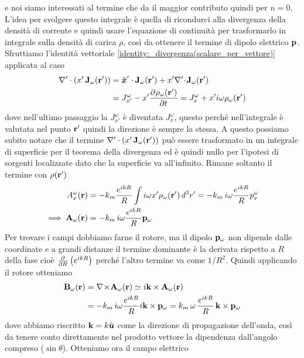 e noi siamo interessati al termine che da il maggior contributo quindi per $ n = 0 $. L'idea per svolgere questo integrale è quella di ricondurci alla 
divergenza della densità di corrente e quindi usare l'equazione di continuità per trasformarlo in integrale sulla densità di carica $ \rho $, così da 
ottenere il termine di dipolo elettrico $ \mathbf{p} $. Sfruttiamo l'identità vettoriale \eqref{identity:_divergenza(scalare_per_vettore)} applicata al caso
\begin{align}
  \nabla' \cdot \left( x' \, \mathbf{J}_\omega(\mathbf{r'}) \right) &= \hat{\boldsymbol{x}}' \cdot \mathbf{J}_\omega(\mathbf{r'}) + x' \nabla'\!\cdot\!\mathbf{ J }_\omega(\mathbf{r'}) 
  \\
  &= J_{x'}^\omega - x' \frac{\partial^{} {\rho_\omega(\mathbf{r'})}}{\partial {t}^{}} = J_{x}^\omega + x' i\omega \rho_\omega(\mathbf{r'})
\end{align}
dove nell'ultimo passaggio la $ J_{x'}^\omega $ è diventata $ J_{x}^\omega $, questo perché nell'integrale è valutata nel punto $ \mathbf{r'} $ quindi la 
direzione è sempre la stessa. A questo possiamo subito notare che il termine $ \nabla' \cdot \left( x' \, \mathbf{J}_\omega(\mathbf{r'}) \right) $ può essere 
trasformato in un integrale di superficie per il teorema della divergenza ed è quindi nullo per l'ipotesi di sorgenti localizzate dato che la superficie 
va all'infinito. Rimane soltanto il termine con $ \rho(\mathbf{r'}) $
\begin{align}
  A_{x}^\omega(\mathbf{r}) &= -k_m \frac{e^{ikR}}{R} \int i\omega x'\rho_\omega(\mathbf{r'}) \,d^3r' 
  = -k_m \, i \omega \frac{e^{ikR}}{R} p_{x}^\omega
  \\
  \implies \mathbf{A}_{\omega}(\mathbf{r}) &= -k_m \,i \omega \frac{e^{ikR}}{R} \mathbf{p}_{\omega}
\end{align}
Per trovare i campi dobbiamo farne il rotore, ma il dipolo $ \mathbf{p}_\omega $ non dipende dalle coordinate e a grandi distanze il termine dominante è la 
derivata rispetto a $ R $ della fase cioè $ \frac{\partial^{} {}}{\partial {R}^{}} \left( e^{ikR} \right) $ perché l'altro termine va come $ 1/R^2 $. Quindi applicando il rotore 
otteniamo
\begin{align}
  \mathbf{B}_\omega(\mathbf{r}) &= \nabla\!\times\!\mathbf{ A }_\omega(\mathbf{r}) \simeq i \mathbf{k} \times \mathbf{A}_\omega(\mathbf{r})
  \\
  &= - k_m \,i\omega \frac{e^{ikR}}{R} i \mathbf{k} \times \mathbf{p}_\omega
  = k_m\,\omega \, \frac{e^{ikR}}{R}\, \mathbf{k} \times \mathbf{p}_\omega
\end{align}
dove abbiamo riscritto $ \mathbf{k} = k \hat{\boldsymbol{u}} $ come la direzione di propagazione dell'onda, così da tenere conto direttamente nel prodotto vettore la 
dipendenza dall'angolo compreso ($ \sin\theta $). Otteniamo ora il campo elettrico
